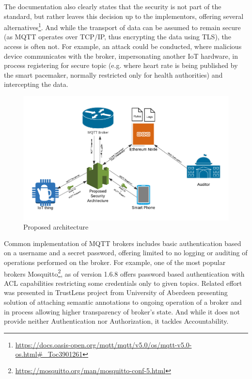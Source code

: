 \documentclass[a4paper,12pt]{article}
\begin{document}
The documentation also clearly states that the security is not part of the standard, but rather leaves this decision up to the implementors, offering several alternatives\footnote{\url{https://docs.oasis-open.org/mqtt/mqtt/v5.0/os/mqtt-v5.0-os.html\#\_Toc3901261}}. And while the transport of data can be assumed to remain secure (as MQTT operates over TCP/IP, thus encrypting the data using TLS), the access is often not. For example, an attack could be conducted, where malicious device communicates with the broker, impersonating another IoT hardware, in process registering for secure topic (e.g. where heart rate is being published by the smart pacemaker, normally restricted only for health authorities) and intercepting the data.

\begin{figure}[ht]
  \centering
  \includegraphics[scale=1.1]{iot_attack}
  \caption{Proposed architecture}\label{fig:iot1}
\end{figure}

Common implementation of MQTT brokers includes basic authentication based on a username and a secret password, offering limited to no logging or auditing of operations performed on the broker. For example, one of the most popular brokers Mosquitto\footnote{\url{https://mosquitto.org/man/mosquitto-conf-5.html}}, as of version 1.6.8 offers password based authentication with ACL capabilities restricting some credentials only to given topics. Related effort was presented in TrustLens project from University of Aberdeen presenting solution of attaching semantic annotations to ongoing operation of a broker and in process allowing higher transparency of broker's state\cite{10.1145/3366610.3368099}. And while it does not provide neither Authentication nor Authorization, it tackles Accountability.
\end{document}
